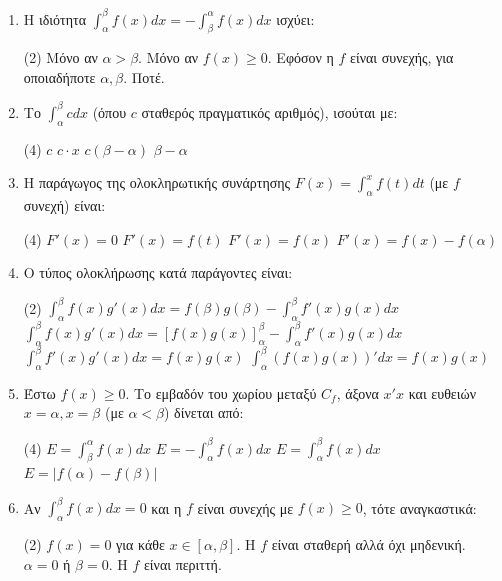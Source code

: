 \documentclass[11pt,a4paper]{article}
\renewcommand{\textdexiakeraia}{}
\newcommand{\dint}{\displaystyle\int}
\begin{document}
\begin{enumerate}[label=\textbf{\arabic*.}, itemsep=4mm]
    \item Η ιδιότητα $\dint_\alpha^\beta f(x) dx = - \dint_\beta^\alpha f(x) dx$ ισχύει:
    \begin{tasks}[label=\let\textdexiakeraia\relax\alph*.](2)
        \task Μόνο αν $\alpha > \beta$.
        \task Μόνο αν $f(x) \ge 0$.
        \task Εφόσον η $f$ είναι συνεχής, για οποιαδήποτε $\alpha, \beta$.
        \task Ποτέ.
    \end{tasks}

    \item Το $\dint_\alpha^\beta c dx$ (όπου $c$ σταθερός πραγματικός αριθμός), ισούται με:
    \begin{tasks}[label=\let\textdexiakeraia\relax\alph*.](4)
        \task $c$
        \task $c\cdot x$
        \task $c(\beta - \alpha)$
        \task $\beta - \alpha$
    \end{tasks}

    \item Η παράγωγος της ολοκληρωτικής συνάρτησης $F(x) = \dint_\alpha^x f(t) dt$ (με $f$ συνεχή) είναι:
    \begin{tasks}[label=\let\textdexiakeraia\relax\alph*.](4)
        \task $F'(x) = 0$
        \task $F'(x) = f(t)$
        \task $F'(x) = f(x)$
        \task $F'(x) = f(x) - f(\alpha)$
    \end{tasks}

    \item Ο τύπος ολοκλήρωσης κατά παράγοντες είναι:
    \begin{tasks}[label=\let\textdexiakeraia\relax\alph*.](2)
        \task $\dint_\alpha^\beta f(x)g'(x) dx = f(\beta)g(\beta) - \dint_\alpha^\beta f'(x)g(x) dx$
        \task $\dint_\alpha^\beta f(x)g'(x) dx = [f(x)g(x)]_\alpha^\beta - \dint_\alpha^\beta f'(x)g(x) dx$
        \task $\dint_\alpha^\beta f'(x)g'(x) dx = f(x)g(x)$
        \task $\dint_\alpha^\beta (f(x)g(x))' dx = f(x) g(x)$
    \end{tasks}

    \item Έστω $f(x) \ge 0$. Το εμβαδόν του χωρίου μεταξύ $C_f$, άξονα $x'x$ και ευθειών $x=\alpha, x=\beta$ (με $\alpha<\beta$) δίνεται από:
    \begin{tasks}[label=\let\textdexiakeraia\relax\alph*.](4)
        \task $E = \dint_\beta^\alpha f(x) dx$
        \task $E = - \dint_\alpha^\beta f(x) dx$
        \task $E = \dint_\alpha^\beta f(x) dx$
        \task $E = |f(\alpha) - f(\beta)|$
    \end{tasks}

    \item Αν $\dint_\alpha^\beta f(x) dx = 0$ και η $f$ είναι συνεχής με $f(x) \ge 0$, τότε αναγκαστικά:
    \begin{tasks}[label=\let\textdexiakeraia\relax\alph*.](2)
        \task $f(x) = 0$ για κάθε $x \in [\alpha, \beta]$.
        \task H $f$ είναι σταθερή αλλά όχι μηδενική.
        \task $\alpha = 0$ ή $\beta = 0$.
        \task H $f$ είναι περιττή.
    \end{tasks}


\end{enumerate}
\end{document}

